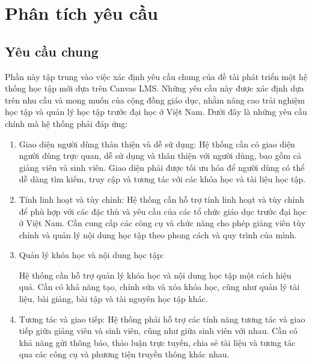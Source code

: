 \documentclass[../Thesis.tex]{subfiles}
\begin{document}
\section{Phân tích yêu cầu}
    \subsection{Yêu cầu chung}
        Phần này tập trung vào việc xác định yêu cầu chung của đề tài phát triển một hệ thống học tập mới dựa trên Canvas LMS. Những yêu cầu này được xác định dựa trên nhu cầu và mong muốn của cộng đồng giáo dục, nhằm nâng cao trải nghiệm học tập và quản lý học tập trước đại học ở Việt Nam. Dưới đây là những yêu cầu chính mà hệ thống phải đáp ứng:

        \begin{enumerate}
        
            \item Giao diện người dùng thân thiện và dễ sử dụng:
            Hệ thống cần có giao diện người dùng trực quan, dễ sử dụng và thân thiện với người dùng, bao gồm cả giảng viên và sinh viên.
            Giao diện phải được tối ưu hóa để người dùng có thể dễ dàng tìm kiếm, truy cập và tương tác với các khóa học và tài liệu học tập.
            
            \item Tính linh hoạt và tùy chỉnh:
            Hệ thống cần hỗ trợ tính linh hoạt và tùy chỉnh để phù hợp với các đặc thù và yêu cầu của các tổ chức giáo dục trước đại học ở Việt Nam.
            Cần cung cấp các công cụ và chức năng cho phép giảng viên tùy chỉnh và quản lý nội dung học tập theo phong cách và quy trình của mình.
            
            \item Quản lý khóa học và nội dung học tập:
            
            Hệ thống cần hỗ trợ quản lý khóa học và nội dung học tập một cách hiệu quả.
            Cần có khả năng tạo, chỉnh sửa và xóa khóa học, cũng như quản lý tài liệu, bài giảng, bài tập và tài nguyên học tập khác.
            
            \item Tương tác và giao tiếp:
            Hệ thống phải hỗ trợ các tính năng tương tác và giao tiếp giữa giảng viên và sinh viên, cũng như giữa sinh viên với nhau.
            Cần có khả năng gửi thông báo, thảo luận trực tuyến, chia sẻ tài liệu và tương tác qua các công cụ và phương tiện truyền thông khác nhau.
            

\end{enumerate}
\end{document}
